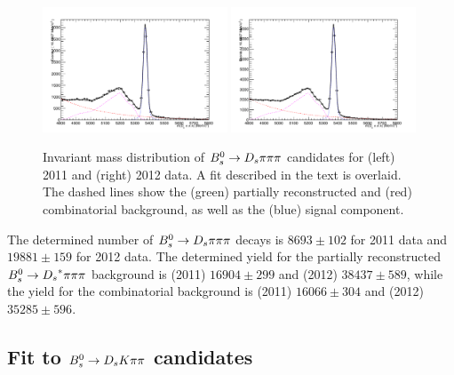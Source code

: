 \begin{figure}[h]
\includegraphics[height=7.cm,width=0.49\textwidth]{figs/3pi_BmassFit_sim11.pdf}
\includegraphics[height=7.cm,width=0.49\textwidth]{figs/3pi_BmassFit_sim12.pdf}
\caption{Invariant mass distribution of ${{B}^0_{s}}\rightarrow{\ensuremath{{D}_{s}}}{\ensuremath{\pi}}{\ensuremath{\pi}}{\ensuremath{\pi}}$ candidates for (left) 2011 and (right) 2012 data.
A fit described in the text is overlaid. The dashed lines show the (green) partially reconstructed and (red) combinatorial background, as well as the (blue) signal component.}
\label{fig: BsDs3piFit}
\end{figure}

The determined number of ${{B}^0_{s}}\rightarrow{\ensuremath{{D}_{s}}}{\ensuremath{\pi}}{\ensuremath{\pi}}{\ensuremath{\pi}}$ decays is $8693 \pm 102$ for 2011 data and $19881 \pm 159$ for 2012 data. 
The determined yield for the partially reconstructed ${{B}^0_{s}}\rightarrow{\ensuremath{{D}_{s}}}^{*}{\pi}{\pi}{\pi}$ background is  (2011) $16904 \pm 299$ and (2012)  $38437 \pm 589$, 
while the yield for the combinatorial background is (2011) $16066 \pm 304$ and (2012) $35285 \pm 596$.



\subsection{Fit to ${{B}^0_{s}}\rightarrow{\ensuremath{{D}_{s}}}{\ensuremath{K}}{\ensuremath{\pi}}{\ensuremath{\pi}}$ candidates}
\label{subsec: SigFit}

